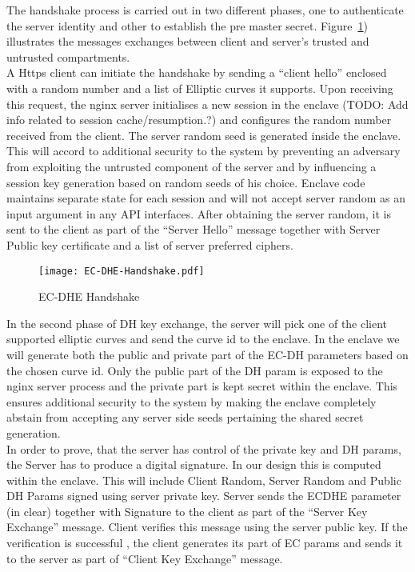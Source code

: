 \documentclass[../../main.tex]{subfiles}
\begin{document}
\noindent
The handshake process is carried out in two different phases, one to
authenticate the server identity and other to establish the pre master
secret.  Figure~\ref{fig:ecdhe_handshake}) illustrates the messages
exchanges between client and server’s trusted and untrusted compartments.\\

\noindent
A Https client can initiate the handshake by sending a “client hello”
enclosed with a random number and a list of Elliptic curves it
supports. Upon receiving this request, the nginx server initialises a
new session in the enclave (TODO: Add info related to session
cache/resumption.?) and configures the random number received from the
client. The server random seed is generated inside the enclave. This
will accord to additional security to the system by preventing an
adversary from exploiting the untrusted component of the server and by
influencing a session key generation based on random seeds of his
choice. Enclave code maintains separate state for each session and
will not accept server random as an input argument in any API
interfaces. After obtaining the server random, it is sent to the
client as part of the “Server Hello” message together with Server
Public key certificate and a list of server preferred ciphers.

\begin{figure}[H]
  \centering
  \texttt{[image: EC-DHE-Handshake.pdf]}
  \caption{EC-DHE Handshake}
  \label{fig:ecdhe_handshake}
\end{figure}

\noindent
In the second phase of DH key exchange, the server will pick one of
the client supported elliptic curves and send the curve id to the
enclave. In the enclave we will generate both the public and private
part of the EC-DH parameters based on the chosen curve id. Only the
public part of the DH param is exposed to the nginx server process and
the private part is kept secret within the enclave. This ensures
additional security to the system by making the enclave completely
abstain from accepting any server side seeds pertaining the shared
secret generation.\\

\noindent
In order to prove, that the server has control of the private key and
DH params, the Server has to produce a digital signature. In our
design this is computed within the enclave. This will include Client
Random, Server Random and Public DH Params signed using server private
key. Server sends the ECDHE parameter (in clear) together with
Signature to the client as part of the “Server Key Exchange”
message. Client verifies this message using the server public key. If
the verification is successful , the client generates its part of EC
params and sends it to the server as part of “Client Key Exchange”
message.\\
\end{document}
